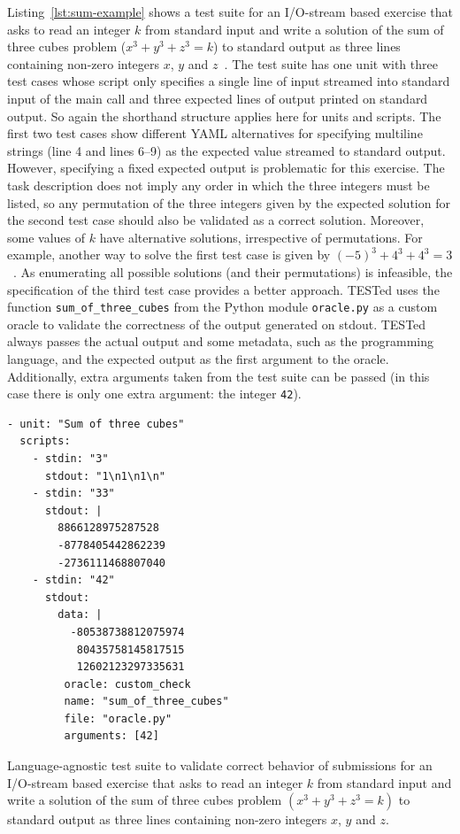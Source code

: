 \documentclass[../main]{subfiles}
\begin{document}
Listing~\ref{lst:sum-example} shows a test suite for an I/O-stream based exercise that asks to read an integer $k$ from standard input and write a solution of the sum of three cubes problem ($x^3 + y^3 + z^3 = k$) to standard output as three lines containing non-zero integers $x$, $y$ and $z$~\autocite{bookerCrackingProblem332019}.
The test suite has one unit with three test cases whose script only specifies a single line of input streamed into standard input of the main call and three expected lines of output printed on standard output.
So again the shorthand structure applies here for units and scripts.
The first two test cases show different YAML alternatives for specifying multiline strings (line 4 and lines 6--9) as the expected value streamed to standard output.
However, specifying a fixed expected output is problematic for this exercise.
The task description does not imply any order in which the three integers must be listed, so any permutation of the three integers given by the expected solution for the second test case should also be validated as a correct solution.
Moreover, some values of $k$ have alternative solutions, irrespective of permutations.
For example, another way to solve the first test case is given by $(-5)^3 + 4^3 + 4^3 = 3$~\autocite{sutherlandSumsThreeCubes2019}.
As enumerating all possible solutions (and their permutations) is infeasible, the specification of the third test case provides a better approach.
TESTed uses the function \texttt{sum\_of\_three\_cubes} from the Python module \texttt{oracle.py} as a custom oracle to validate the correctness of the output generated on stdout.
TESTed always passes the actual output and some metadata, such as the programming language, and the expected output as the first argument to the oracle.
Additionally, extra arguments taken from the test suite can be passed (in this case there is only one extra argument: the integer \texttt{42}).

\begin{listing}
    \begin{verbatim}
- unit: "Sum of three cubes"
  scripts:
    - stdin: "3"
      stdout: "1\n1\n1\n"
    - stdin: "33"
      stdout: |
        8866128975287528
        -8778405442862239
        -2736111468807040
    - stdin: "42"
      stdout:
        data: |
          -80538738812075974
           80435758145817515
           12602123297335631
         oracle: custom_check
         name: "sum_of_three_cubes"
         file: "oracle.py"
         arguments: [42]
    \end{verbatim}
    \caption[]{
        Language-agnostic test suite to validate correct behavior of submissions for an I/O-stream based exercise that asks to read an integer \(k\) from standard input and write a solution of the sum of three cubes problem \((x^3 + y^3 + z^3 = k)\) to standard output as three lines containing non-zero integers \(x\), \(y\) and \(z\).
    }
    \label{lst:sum-example}
\end{listing}
\end{document}
